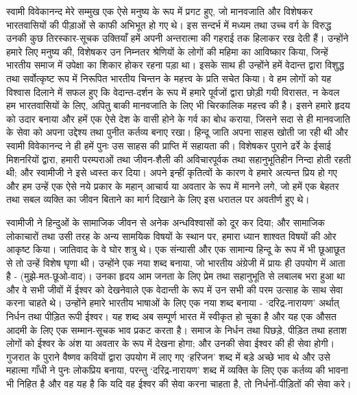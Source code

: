 स्वामी विवेकानन्द मेरे सम्मुख एक ऐसे मनुष्य के रूप में प्रगट हुए, जो मानवजाति और विशेषकर भारतवासियों की पीड़ाओं से काफी अभिभूत हो गए थे। इस सन्दर्भ में मध्यम तथा उच्च वर्ग के विरुद्ध उनकी कुछ तिरस्कार-सूचक उक्तियाँ हमें अपनी अन्तरात्मा की गहराई तक हिलाकर रख देती हैं। उन्होंने हमारे लिए मनुष्य की, विशेषकर उन निम्नतर श्रेणियों के लोगों की महिमा का आविष्कार किया, जिन्हें भारतीय समाज में उपेक्षा का शिकार होकर रहना पड़ा था। इसके साथ ही उन्होंने हमें वेदान्त द्वारा विशुद्ध तथा सर्वोत्कृष्ट रूप में निरूपित भारतीय चिन्तन के महत्त्व के प्रति सचेत किया। वे हम लोगों को यह विश्वास दिलाने में सफल हुए कि वेदान्त-दर्शन के रूप में हमारे पूर्वजों द्वारा छोड़ी गयी विरासत, न केवल हम भारतवासियों के लिए, अपितु बाकी मानवजाति के लिए भी चिरकालिक महत्त्व की है। इसने हमारे हृदय को उदार बनाया और हमें एक ऐसे देश के वासी होने के गर्व का बोध कराया, जिसने सदा से ही मानवजाति के सेवा को अपना उद्देश्य तथा पुनीत कर्तव्य बनाए रखा। हिन्दू जाति अपना साहस खोती जा रही थी और स्वामी विवेकानन्द ने ही हमें पुनः उस साहस की प्राप्ति में सहायता की। विशेषकर पुराने ढर्रे के ईसाई मिशनरियों द्वारा, हमारी परम्पराओं तथा जीवन-शैली की अविचारपूर्वक तथा सहानुभूतिहीन निन्दा होती रहती थी; और स्वामीजी ने इसे ध्वस्त कर दिया। अपने इन्हीं कृतित्वों के कारण वे हमारे अत्यन्त प्रिय हो गए और हम उन्हें एक ऐसे नये प्रकार के महान् आचार्य या अवतार के रूप में मानने लगे, जो हमें एक बेहतर तथा सबल व्यक्ति का जीवन बिताने का मार्ग दिखाने के लिए इस धरातल पर अवतीर्ण हुए थे। 

स्वामीजी ने हिन्दुओं के सामाजिक जीवन से अनेक अन्धविश्वासों को दूर कर दिया; और सामाजिक लोकाचारों तथा उसी तरह के अन्य सामयिक विषयों के स्थान पर, हमारा ध्यान शाश्वत विषयों की ओर आकृष्ट किया। जातिवाद के वे घोर शत्रु थे। एक संन्यासी और एक सामान्य हिन्दू के रूप में भी छूआछूत से तो उन्हें विशेष घृणा थी। उन्होंने एक नया शब्द बनाया, जो भारतीय अंग्रेजी में प्रायः ही उपयोग में आता है - \enginline{} (मुझे-मत-छूओ-वाद)। उनका हृदय आम जनता के लिए प्रेम तथा सहानुभूति से लबालब भरा हुआ था और वे सभी जीवों में ईश्वर को देखनेवाले एक वेदान्ती के रूप में उन सभी की परम उत्साह के साथ सेवा करना चाहते थे। उन्होंने हमारे भारतीय भाषाओं के लिए एक नया शब्द बनाया - ‘दरिद्र-नारायण’ अर्थात् निर्धन तथा पीड़ित रूपी ईश्वर। यह शब्द अब सम्पूर्ण भारत में स्वीकृत हो चुका है और यह एक औसत आदमी के लिए एक सम्मान-सूचक भाव प्रकट करता है। समाज के निर्धन तथा पिछड़े, पीड़ित तथा हताश लोगों को ईश्वर के अंश या अवतार के रूप में देखना होगा; और उनकी सेवा ईश्वर की ही सेवा होगी। गुजरात के पुराने वैष्णव कवियों द्वारा उपयोग में लाए गए ‘हरिजन’ शब्द में बड़े अच्छे भाव थे और उसे महात्मा गाँधी ने पुनः लोकप्रिय बनाया, परन्तु ‘दरिद्र-नारायण’ शब्द में व्यक्ति के लिए एक कर्तव्य की भावना भी निहित है और वह यह है कि यदि वह ईश्वर की सेवा करना चाहता है, तो निर्धनों-पीड़ितों की सेवा करे। 

